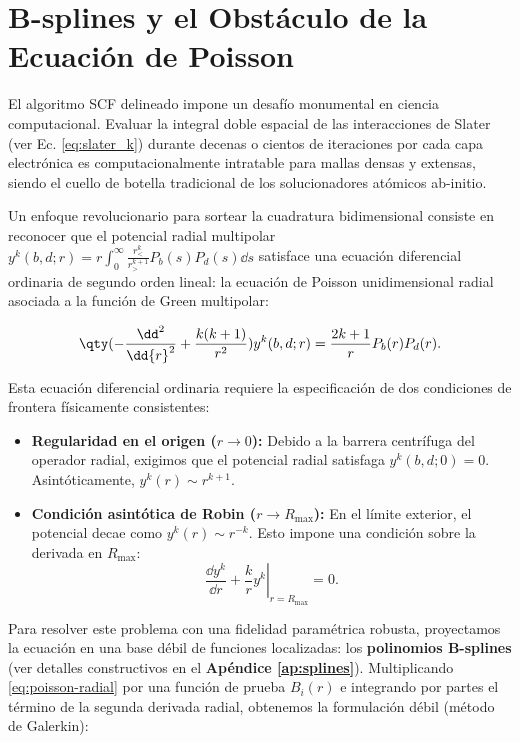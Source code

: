 \section{B-splines y el Obstáculo de la Ecuación de Poisson}

El algoritmo SCF delineado impone un desafío monumental en ciencia computacional. Evaluar la integral doble espacial de las interacciones de Slater (ver Ec. \ref{eq:slater_k}) durante decenas o cientos de iteraciones por cada capa electrónica es computacionalmente intratable para mallas densas y extensas, siendo el cuello de botella tradicional de los solucionadores atómicos ab-initio.

Un enfoque revolucionario para sortear la cuadratura bidimensional consiste en reconocer que el potencial radial multipolar $y^k(b,d;r) = r \int_0^\infty \frac{r_{<}^k}{r_{>}^{k+1}} P_b(s) P_d(s) \dd{s}$ satisface una ecuación diferencial ordinaria de segundo orden lineal: la ecuación de Poisson unidimensional radial asociada a la función de Green multipolar:

\begin{equation}
  \label{eq:poisson-radial}
  \qty( -\frac{\dd^2}{\dd{r}^2} + \frac{k(k+1)}{r^2} ) y^k(b, d; r) = \frac{2k+1}{r} P_b(r) P_d(r).
\end{equation}

Esta ecuación diferencial ordinaria requiere la especificación de dos condiciones de frontera físicamente consistentes:
\begin{itemize}
\item \textbf{Regularidad en el origen (\(r \to 0\)):} Debido a la barrera centrífuga del operador radial, exigimos que el potencial radial satisfaga \( y^k(b,d;0) = 0 \). Asintóticamente, \( y^k(r) \sim r^{k+1} \).
\item \textbf{Condición asintótica de Robin (\(r \to R_{\text{max}}\)):} En el límite exterior, el potencial decae como \( y^k(r) \sim r^{-k} \). Esto impone una condición sobre la derivada en \( R_{\text{max}} \):
  \begin{equation}
    \label{eq:robin}
    \left. \frac{\dd{y^k}}{\dd{r}} + \frac{k}{r} y^k \right|_{r=R_{\text{max}}} = 0.
  \end{equation}
\end{itemize}

Para resolver este problema con una fidelidad paramétrica robusta, proyectamos la ecuación en una base débil de funciones localizadas: los \textbf{polinomios B-splines} (ver detalles constructivos en el \textbf{Apéndice \ref{ap:splines}}). 
Multiplicando \eqref{eq:poisson-radial} por una función de prueba \( B_i(r) \) e integrando por partes el término de la segunda derivada radial, obtenemos la formulación débil (método de Galerkin):

